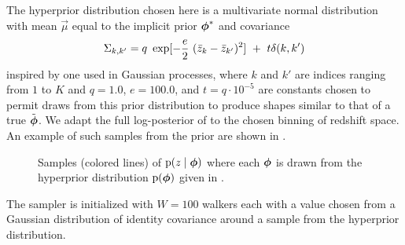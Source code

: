 The hyperprior distribution chosen here is a multivariate normal distribution with mean $\vec{\mu}$ equal to the implicit prior ${\boldsymbol{\phi}}^{*}$ and covariance
\begin{equation}
\eqlabel{eqn:priorcov}
\Sigma_{k,k'} = q\ \exp[-\frac{e}{2}\ (\bar{z}_{k}-\bar{z}_{k'})^{2}]\ +\ t\delta(k,k')
\end{equation}
inspired by one used in Gaussian processes, where $k$ and $k'$ are indices ranging from $1$ to $K$ and $q=1.0$, $e=100.0$, and $t=q\cdot10^{-5}$ are constants chosen to permit draws from this prior distribution to produce shapes similar to that of a true $\tilde{{\boldsymbol{\phi}}}$.  
We adapt the full log-posterior of  to the chosen binning of redshift space.
An example of such samples from the prior are shown in .

\begin{figure}
	\caption{
		Samples (colored lines) of $\mathrm{p}(z \mid {\ensuremath{\boldsymbol{\phi}}})$ where each ${\boldsymbol{\phi}}$ is drawn from the hyperprior distribution $\mathrm{p}({\boldsymbol{\phi}})$ given in .}
\end{figure}

The sampler is initialized with $W=100$ walkers each with a value chosen from a Gaussian distribution of identity covariance around a sample from the hyperprior distribution.  

%

